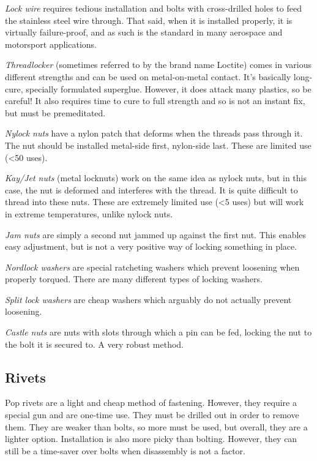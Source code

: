 \documentclass[10pt,letterpaper]{book}
\begin{document}
	\begin{asparaenum}[a)]
		\item \textit{Lock wire} requires tedious installation and bolts with cross-drilled holes to feed the stainless steel wire through. That said, when it is installed properly, it is virtually failure-proof, and as such is the standard in many aerospace and motorsport applications. 
		\item \textit{Threadlocker} (sometimes referred to by the brand name Loctite) comes in various different strengths and can be used on metal-on-metal contact. It's basically long-cure, specially formulated superglue. However, it does attack many plastics, so be careful! It also requires time to cure to full strength and so is not an instant fix, but must be premeditated.
		\item \textit{Nylock nuts} have a nylon patch that deforms when the threads pass through it. The nut should be installed metal-side first, nylon-side last. These are limited use (<50 uses).
		\item \textit{Kay/Jet nuts} (metal locknuts) work on the same idea as nylock nuts, but in this case, the nut is deformed and interferes with the thread. It is quite difficult to thread into these nuts. These are extremely limited use (<5 uses) but will work in extreme temperatures, unlike nylock nuts.
		\item \textit{Jam nuts} are simply a second nut jammed up against the first nut. This enables easy adjustment, but is not a very positive way of locking something in place.
		\item \textit{Nordlock washers} are special ratcheting washers which prevent loosening when properly torqued. There are many different types of locking washers.
		\item \textit{Split lock washers} are cheap washers which arguably do not actually prevent loosening.
		\item \textit{Castle nuts} are nuts with slots through which a pin can be fed, locking the nut to the bolt it is secured to. A very robust method.
	\end{asparaenum}
	
	\subsection{Rivets}
	
	Pop rivets are a light and cheap method of fastening. However, they require a special gun and are one-time use. They must be drilled out in order to remove them. They are weaker than bolts, so more must be used, but overall, they are a lighter option. Installation is also more picky than bolting. However, they can still be a time-saver over bolts when disassembly is not a factor.
	
\end{document}
